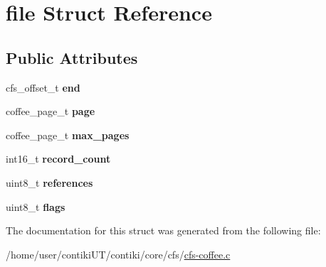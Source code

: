 \hypertarget{structfile}{}\section{file Struct Reference}
\label{structfile}
\subsection*{Public Attributes}
\begin{DoxyCompactItemize}
\item 
\hypertarget{structfile_a83f9b5c9f2496263b52c4dff55fbd93d}{}cfs\+\_\+offset\+\_\+t {\bfseries end}\label{structfile_a83f9b5c9f2496263b52c4dff55fbd93d}

\item 
\hypertarget{structfile_a75ba3ca10c1798e480c340c04f3ed498}{}coffee\+\_\+page\+\_\+t {\bfseries page}\label{structfile_a75ba3ca10c1798e480c340c04f3ed498}

\item 
\hypertarget{structfile_aeb1d9f01b6993dfef58637f82d8c5644}{}coffee\+\_\+page\+\_\+t {\bfseries max\+\_\+pages}\label{structfile_aeb1d9f01b6993dfef58637f82d8c5644}

\item 
\hypertarget{structfile_add7aea9d933d2533f3b8484b68f2d3a7}{}int16\+\_\+t {\bfseries record\+\_\+count}\label{structfile_add7aea9d933d2533f3b8484b68f2d3a7}

\item 
\hypertarget{structfile_a477071777b753411fd727532a9c62676}{}uint8\+\_\+t {\bfseries references}\label{structfile_a477071777b753411fd727532a9c62676}

\item 
\hypertarget{structfile_a0a469232e318164b070518de49d1bbfc}{}uint8\+\_\+t {\bfseries flags}\label{structfile_a0a469232e318164b070518de49d1bbfc}

\end{DoxyCompactItemize}


The documentation for this struct was generated from the following file\+:\begin{DoxyCompactItemize}
\item 
/home/user/contiki\+U\+T/contiki/core/cfs/\hyperlink{cfs-coffee_8c}{cfs-\/coffee.\+c}\end{DoxyCompactItemize}
